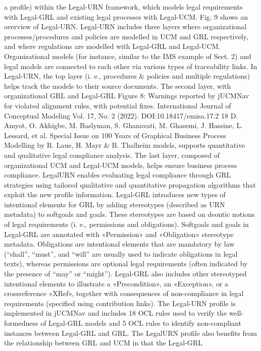 a profile) within the Legal-URN framework, which
models legal requirements with Legal-GRL and
existing legal processes with Legal-UCM. Fig. 9
shows an overview of Legal-URN. Legal-URN
includes three layers where organizational processes/procedures and policies are modelled in UCM
and GRL respectively, and where regulations are
modelled with Legal-GRL and Legal-UCM. Organizational models (for instance, similar to the IMS
example of Sect. 2) and legal models are connected
to each other via various types of traceability links.
In Legal-URN, the top layer (i. e., procedures &
policies and multiple regulations) helps track the
models to their source documents. The second
layer, with organizational GRL and Legal-GRL
Figure 8: Warnings reported by jUCMNav for violated alignment rules, with potential fixes.
International Journal of Conceptual Modeling
Vol. 17, No. 2 (2022). DOI:10.18417/emisa.17.2
18 D. Amyot, O. Akhigbe, M. Baslyman, S. Ghanavati, M. Ghasemi, J. Hassine, L. Lessard, et al.
Special Issue on 100 Years of Graphical Business Process Modelling by R. Laue, H. Mayr & B. Thalheim
models, supports quantitative and qualitative legal
compliance analysis. The last layer, composed
of organizational UCM and Legal-UCM models,
helps ensure business process compliance. LegalURN enables evaluating legal compliance through
GRL strategies using tailored qualitative and quantitative propagation algorithms that exploit the new
profile information.
Legal-GRL introduces new types of intentional
elements for GRL by adding stereotypes (described as URN metadata) to softgoals and goals.
These stereotypes are based on deontic notions of
legal requirements (i. e., permissions and obligations). Softgoals and goals in Legal-GRL are annotated with «Permission» and «Obligation» stereotype metadata. Obligations are intentional elements that are mandatory by law (“shall”, “must”,
and “will” are usually used to indicate obligations
in legal texts), whereas permissions are optional legal requirements (often indicated by the presence
of “may” or “might”). Legal-GRL also includes
other stereotyped intentional elements to illustrate
a «Precondition», an «Exception», or a crossreference «XRef», together with consequences of
non-compliance in legal requirements (specified
using contribution links).
The Legal-URN profile is implemented in
jUCMNav and includes 18 OCL rules used to
verify the well-formedness of Legal-GRL models
and 5 OCL rules to identify non-compliant instances between Legal-GRL and GRL. The LegalURN profile also benefits from the relationship
between GRL and UCM in that the Legal-GRL
